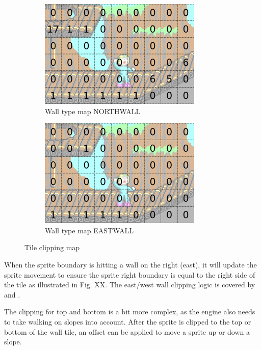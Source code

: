 \documentclass[book.tex]{subfiles}
\begin{document}
\begin{figure}[H]
\centering
\begin{subfigure}{.5\textwidth}
  \centering
  \includegraphics[width=.9\textwidth]{screenshots_300dpi/game/clip_tinf_1.png}
  \caption{Wall type map NORTHWALL}
  \label{fig:clip_tinf_n}
\end{subfigure}%
\begin{subfigure}{.5\textwidth}
  \centering
  \includegraphics[width=.9\textwidth]{screenshots_300dpi/game/clip_tinf_east.png}
  \caption{Wall type map EASTWALL}
  \label{fig:clip_tinf_e}
\end{subfigure}
\caption{Tile clipping map}
\label{fig:clip_tinf}
\end{figure}

\par
When the sprite boundary is hitting a wall on the right (east), it will update the sprite movement to ensure the sprite right boundary is equal to the right side of the tile as illustrated in Fig. XX. The east/west wall clipping logic is covered by  and . \\
\par
\begin{minipage}{\textwidth}
  
\end{minipage}
\label{wallclip_array}
\par
The clipping for top and bottom is a bit more complex, as the engine also needs to take walking on slopes into account. After the sprite is clipped to the top or bottom of the wall tile, an offset can be applied to move a sprite up or down a slope. 
\end{document}
